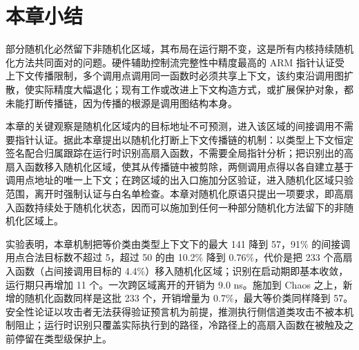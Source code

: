 \section{本章小结}

部分随机化必然留下非随机化区域，其布局在运行期不变，这是所有内核持续随机化方法共同面对的问题。硬件辅助控制流完整性中精度最高的 ARM 指针认证受上下文传播限制，多个调用点调用同一函数时必须共享上下文，该约束沿调用图扩散，使实际精度大幅退化；现有工作或改进上下文构造方式，或扩展保护对象，都未能打断传播链，因为传播的根源是调用图结构本身。

本章的关键观察是随机化区域内的目标地址不可预测，进入该区域的间接调用不需要指针认证。据此本章提出以随机化打断上下文传播链的机制：以类型上下文恒定签名配合归属跟踪在运行时识别高扇入函数，不需要全局指针分析；把识别出的高扇入函数移入随机化区域，使其从传播链中被剪除，两侧调用点得以各自建立基于调用点地址的唯一上下文；在跨区域的出入口施加分区验证，进入随机化区域只验范围，离开时强制认证与白名单检查。本章对随机化原语只提出一项要求，即高扇入函数持续处于随机化状态，因而可以施加到任何一种部分随机化方法留下的非随机化区域上。

实验表明，本章机制把等价类由类型上下文下的最大 141 降到 57，91\% 的间接调用点合法目标数不超过 5，超过 50 的由 10.2\% 降到 0.76\%，代价是把 233 个高扇入函数（占间接调用目标的 4.4\%）移入随机化区域；识别在启动期即基本收敛，运行期只再增加 11 个。一次跨区域离开的开销为 9.0 ns。施加到 Chaos 之上，新增的随机化函数同样是这批 233 个，开销增量为 0.7\%，最大等价类同样降到 57。安全性论证以攻击者无法获得验证预言机为前提，推测执行侧信道类攻击不被本机制阻止；运行时识别只覆盖实际执行到的路径，冷路径上的高扇入函数在被触及之前停留在类型级保护上。

